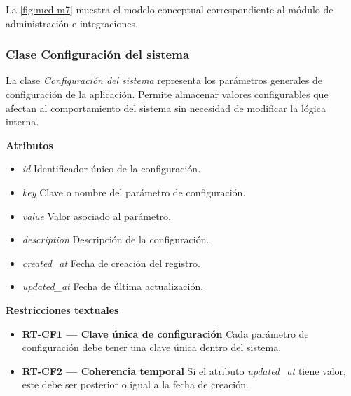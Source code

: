 La \autoref{fig:mcd-m7} muestra el modelo conceptual correspondiente al módulo de administración e integraciones.


\subsubsection{Clase Configuración del sistema}

La clase \textit{Configuración del sistema} representa los parámetros generales de configuración de la aplicación. Permite almacenar valores configurables que afectan al comportamiento del sistema sin necesidad de modificar la lógica interna.

\textbf{Atributos}

\begin{itemize}

      \item \textit{id}
            Identificador único de la configuración.
      \item \textit{key}
            Clave o nombre del parámetro de configuración.
      \item \textit{value}
            Valor asociado al parámetro.
      \item \textit{description}
            Descripción de la configuración.
      \item \textit{created\_at}
            Fecha de creación del registro.
      \item \textit{updated\_at}
            Fecha de última actualización.

\end{itemize}

\textbf{Restricciones textuales}

\begin{itemize}

      \item \textbf{RT-CF1 — Clave única de configuración}
            Cada parámetro de configuración debe tener una clave única dentro del sistema.
      \item \textbf{RT-CF2 — Coherencia temporal}
            Si el atributo \textit{updated\_at} tiene valor, este debe ser posterior o igual a la fecha de creación.

\end{itemize}

